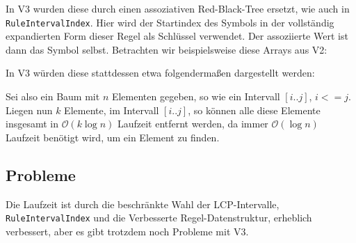 In V3 wurden diese durch einen assoziativen Red-Black-Tree ersetzt, wie auch in \texttt{RuleIntervalIndex}. Hier wird der Startindex des Symbols in der vollständig expandierten Form dieser Regel als Schlüssel verwendet. Der assoziierte Wert ist dann das Symbol selbst. Betrachten wir beispielsweise diese Arrays aus V2:

\begin{figure}[H]
	\centering
	\quad
\end{figure}

In V3 würden diese stattdessen etwa folgendermaßen dargestellt werden:

\begin{figure}[H]
	\centering
\end{figure}

Sei also ein Baum mit $n$ Elementen gegeben, so wie ein Intervall $[i..j]$, $i <= j$. Liegen nun $k$ Elemente, im Intervall $[i..j]$, so können alle diese Elemente insgesamt in $\mathcal{O}(k \log n)$ Laufzeit entfernt werden, da immer $\mathcal{O}(\log n)$ Laufzeit benötigt wird, um ein Element zu finden.

\subsection{Probleme}
\label{v3problems}

Die Laufzeit ist durch die beschränkte Wahl der LCP-Intervalle, \texttt{RuleIntervalIndex} und die Verbesserte Regel-Datenstruktur, erheblich verbessert, aber es gibt trotzdem noch Probleme mit V3.

